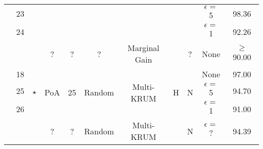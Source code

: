 \begin{landscape}
\begin{table}[]
\begin{tabular}{c|c|c|c|c|c|c|c|c|c|c}
                                                                                            & 23                  &                                            &                            &                          &                         &                                &                    &                    & $\epsilon =$ 5                  & 98.36                                  \\
                                                                                            & 24                  &                                            &                            &                          &                         &                                &                    &                    & $\epsilon =$ 1                  & 92.26                                  \\
                                                                                            &                     & \cite{10.48550/arxiv.2011.07516}                  & ?                          & ?                        & ?                       & Marginal Gain                  &                    & ?                  & None                   & $\geq$ 90.00                  \\
                                                                                            & 18                  & \multirow{3}{*}{$\star$}                         & \multirow{3}{*}{PoA}       & \multirow{3}{*}{25}      & \multirow{3}{*}{Random} & \multirow{3}{*}{Multi-KRUM}    & \multirow{3}{*}{H} & \multirow{3}{*}{N} & None                   & 97.00                                  \\
                                                                                            & 25                  &                                            &                            &                          &                         &                                &                    &                    & $\epsilon =$ 5                  & 94.70                                  \\
                                                                                            & 26                  &                                            &                            &                          &                         &                                &                    &                    & $\epsilon =$ 1                  & 91.00                                  \\
                                                                                            &                     & \cite{Peyvandi2022}                               & ?                          & \multirow{4}{*}{?}       & Random                  & \multirow{4}{*}{Multi-KRUM}    &                    & N                  & $\epsilon =$ ?                  & 94.39                                  \\

\end{tabular}
\end{table}
\end{landscape}
